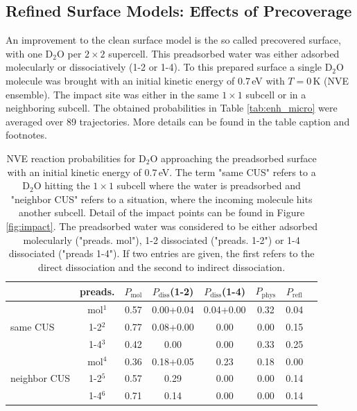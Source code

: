 \documentclass[11pt,DIV=13,BCOR=5mm,a4paper,headinclude]{scrbook}
\begin{document}
\subsection{Refined Surface Models: Effects of Precoverage}
An improvement to the clean surface model is the so called precovered surface, with one D$_2$O per $2\times 2$ supercell.
This preadsorbed water was either adsorbed molecularly or dissociatively (1-2 or 1-4).
To this prepared surface a single D$_2$O molecule was brought with an initial kinetic energy of $0.7\,$eV with $T=0\,$K  (NVE ensemble).
The impact site was either in the same $1\times 1$ subcell or in a neighboring subcell.
The obtained probabilities in Table \ref{tab:enh_micro} were averaged over 89 trajectories.
More details can be found in the table caption and footnotes.
\\
\begin{table}[hbt]
 \centering
  \caption{NVE reaction probabilities for D$_2$O approaching the preadsorbed surface with an initial kinetic energy of $0.7\,$eV.
The term "same CUS" refers to a D$_2$O hitting the $1\times 1$ subcell where the water is preadsorbed and "neighbor CUS" refers to a situation, where the incoming molecule hits another subcell.
Detail of the impact points can be found in Figure \ref{fig:impact}.
The preadsorbed water was considered to be either adsorbed molecularly ("preads. mol"), 1-2 dissociated ("preads. 1-2") or 1-4 dissociated ("preads 1-4").
If two entries are given, the first refers to the direct dissociation and the second to indirect dissociation.
}
 \begin{tabular}{l|c|cccccc}
\toprule
& preads. &$P_\textrm{mol}$ & $P_\textrm{diss}$(1-2) &  $P_\textrm{diss}$(1-4) & $P_\textrm{phys}$ & $P_\textrm{refl}$ \\\midrule
\multirow{3}{*}{same CUS}& mol$^1$ &0.57 &0.00+0.04 &0.04+0.00  &0.32 &0.04 \\
& 1-2$^2$ &0.77 &0.08+0.00 &0.00 &0.00 &0.15 \\
& 1-4$^3$ &0.42 &0.00 &0.00 &0.33 &0.25 \\\hline
\multirow{3}{*}{neighbor CUS}& mol$^4$ &0.36 &0.18+0.05 &0.23 &0.18 & 0.00  \\
& 1-2$^5$ &0.57 &0.29 & 0.00  &0.00 &0.14 \\
& 1-4$^6$ &0.71 &0.14 &0.00 & 0.00 & 0.14 \\\bottomrule
\end{tabular}
\begin{tablenotes}

\end{tablenotes}
\end{table}
\end{document}
